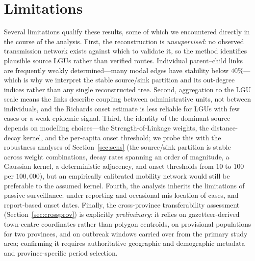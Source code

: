 \documentclass[a4paper,11pt]{article}
\begin{document}
\section{Limitations}
Several limitations qualify these results, some of which we encountered directly in
the course of the analysis. First, the reconstruction is \emph{unsupervised}: no
observed transmission network exists against which to validate it, so the method
identifies plausible source LGUs rather than verified routes. Individual
parent--child links are frequently weakly determined---many modal edges have
stability below $40\%$---which is why we interpret the stable source/sink partition
and its out-degree indices rather than any single reconstructed tree. Second,
aggregation to the LGU scale means the links describe coupling between administrative
units, not between individuals, and the Richards onset estimate is less reliable for
LGUs with few cases or a weak epidemic signal. Third, the identity of the dominant
source depends on modelling choices---the Strength-of-Linkage weights, the
distance-decay kernel, and the per-capita onset threshold; we probe this with the
robustness analyses of Section~\ref{sec:sens} (the source/sink partition is stable
across weight combinations, decay rates spanning an order of magnitude, a Gaussian
kernel, a deterministic adjacency, and onset thresholds from $10$ to $100$ per
$100{,}000$), but an empirically calibrated mobility network would still be preferable
to the assumed kernel.
Fourth, the analysis inherits the limitations of passive surveillance: under-reporting
and occasional mis-location of cases, and report-based onset dates. Finally, the
cross-province transferability assessment
(Section~\ref{sec:crossprov}) is explicitly \emph{preliminary}: it relies on
gazetteer-derived town-centre coordinates rather than polygon centroids, on
provisional populations for two provinces, and on outbreak windows carried over from
the primary study area; confirming it requires authoritative geographic and
demographic metadata and province-specific period selection.

\end{document}
